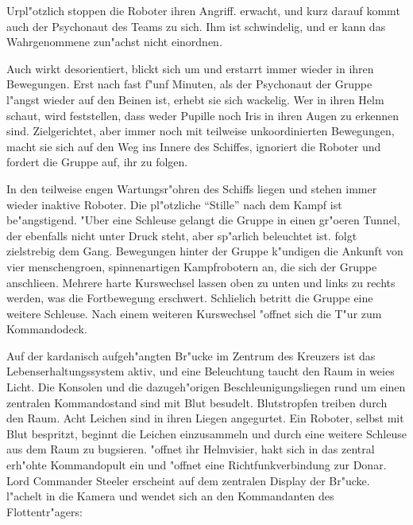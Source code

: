 Urpl"otzlich stoppen die Roboter ihren Angriff. \xl{} erwacht, und kurz darauf kommt auch der Psychonaut des Teams zu sich. Ihm ist schwindelig, und er kann das Wahrgenommene zun"achst nicht einordnen.

Auch \xl{} wirkt desorientiert, blickt sich um und erstarrt immer wieder in ihren Bewegungen. Erst nach fast f"unf Minuten, als der Psychonaut der Gruppe l"angst wieder auf den Beinen ist, erhebt sie sich wackelig. Wer in ihren Helm schaut, wird feststellen, dass weder Pupille noch Iris in ihren Augen zu erkennen sind. Zielgerichtet, aber immer noch mit teilweise unkoordinierten Bewegungen, macht sie sich auf den Weg ins Innere des Schiffes, ignoriert die Roboter und fordert die Gruppe auf, ihr zu folgen.


In den teilweise engen Wartungsr"ohren des Schiffs liegen und stehen immer wieder inaktive Roboter. Die pl"otzliche ``Stille'' nach dem Kampf ist be"angstigend. "Uber eine Schleuse gelangt die Gruppe in einen gr"o\3eren Tunnel, der ebenfalls nicht unter Druck steht, aber sp"arlich beleuchtet ist. \xl{} folgt zielstrebig dem Gang. Bewegungen hinter der Gruppe k"undigen die Ankunft von vier menschengro\3en, spinnenartigen Kampfrobotern an, die sich der Gruppe anschlie\3en. Mehrere harte Kurswechsel lassen oben zu unten und links zu rechts werden, was die Fortbewegung erschwert. Schlie\3lich betritt die Gruppe eine weitere Schleuse. Nach einem weiteren Kurswechsel "offnet sich die T"ur zum Kommandodeck.

Auf der kardanisch aufgeh"angten Br"ucke im Zentrum des Kreuzers ist das Lebenserhaltungssystem aktiv, und eine Beleuchtung taucht den Raum in wei\3es Licht. Die Konsolen und die dazugeh"origen Beschleunigungsliegen rund um einen zentralen Kommandostand sind mit Blut besudelt. Blutstropfen treiben durch den Raum. Acht Leichen sind in ihren Liegen angegurtet. Ein Roboter, selbst mit Blut bespritzt, beginnt die Leichen einzusammeln und durch eine weitere Schleuse aus dem Raum zu bugsieren. \xl{} "offnet ihr Helmvisier, hakt sich in das zentral erh"ohte Kommandopult ein und "offnet eine Richtfunkverbindung zur Donar. Lord Commander Steeler erscheint auf dem zentralen Display der Br"ucke. \xl{} l"achelt in die Kamera und wendet sich an den Kommandanten des Flottentr"agers:

